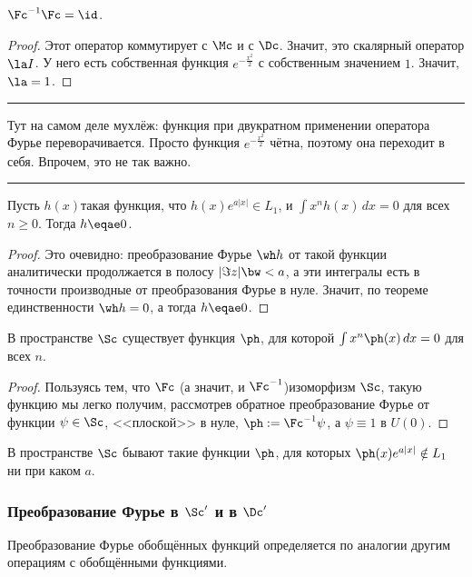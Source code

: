 \documentclass[a4paper]{article}
\newenvironment{petit}
{\par \smallskip \hrule \smallskip \footnotesize}
{\par \smallskip \hrule \smallskip}
\newcommand{\dx}{\,dx}
\begin{document}
\begin{imp}
$\Fc^{-1}\Fc = \id$.
\end{imp}
\begin{proof}
Этот оператор коммутирует с $\Mc$ и с $\Dc$. Значит, это скалярный оператор $\la I$.
У него есть собственная функция $e^{-\frac{x^2}{2}}$ с собственным значением $1$. Значит, $\la =1$.
\end{proof}

\begin{petit}
Тут на самом деле мухлёж: функция при двукратном применении оператора Фурье переворачивается.
Просто функция $e^{-\frac{x^2}{2}}$ чётна, поэтому она переходит в себя. Впрочем, это не так важно.
\end{petit}

\begin{stm}
Пусть $h(x)$\т такая функция, что $h(x)e^{a|x|}\in L_1$, и $\int x^n h(x)\dx=0$ для
всех $n \ge0$. Тогда $h\eqae 0$.
\end{stm}
\begin{proof}
Это очевидно: преобразование Фурье $\wh h$ от такой функции аналитически
продолжается в полосу $|\Im z| \bw< a$, а эти интегралы есть в точности производные
от преобразования Фурье в нуле. Значит, по теореме единственности $\wh h =0$, а тогда $h\eqae 0$.
\end{proof}

\begin{stm}
В пространстве $\Sc$ существует функция $\ph$, для которой $\int x^n\ph(x)\dx=0$ для всех $n$.
\end{stm}
\begin{proof}
Пользуясь тем, что $\Fc$ (а значит, и $\Fc^{-1}$)\т изоморфизм $\Sc$, такую функцию мы легко получим,
рассмотрев обратное преобразование Фурье от функции $\psi\in\Sc$, <<плоской>> в нуле,  $\ph := \Fc^{-1}\psi$,
а $\psi \equiv 1$ в $U(0)$.
\end{proof}
\begin{imp}
В пространстве $\Sc$ бывают такие функции $\ph$, для которых $\ph(x)e^{a|x|}\notin L_1$ ни при каком $a$.
\end{imp}

\subsubsection{Преобразование Фурье в $\Sc'$ и в $\Dc'$}

Преобразование Фурье обобщённых функций определяется по аналогии другим операциям с обобщёнными функциями.
\end{document}
